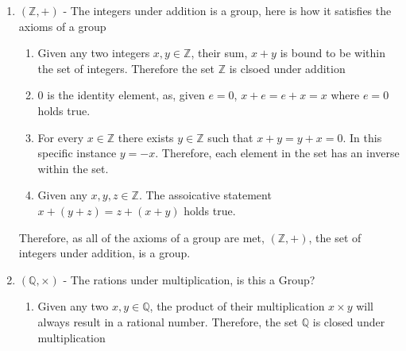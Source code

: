 \documentclass[11pt]{article}
\newcommand{\Q}{{\mathbb{Q}}}
\newcommand{\Z}{{\mathbb{Z}}}
\begin{document}
	\begin{enumerate}[{\bf S1.}] 

        \item $(\Z, +)$ - The integers under addition is a group, here is how it satisfies the axioms of a group
        
            \begin{enumerate}
                
                \item
                
                    Given any two integers $x, y\in\Z$, their sum, $x + y$ is bound to be within
                    the set of integers. Therefore the set $\Z$ is clsoed under addition

                \item 

                    $0$ is the identity element, as, given $e = 0$, $x + e = e + x = x$ where $e = 0$ holds true. 

                \item 

                    For every $x\in\Z$ there exists $y\in\Z$ such that $x + y = y + x = 0$. In this specific instance
                    $y = -x$. Therefore, each element in the set has an inverse within the set. 

                \item 

                    Given any $x, y, z\in\Z$. The assoicative statement $x + (y + z) = z + (x + y)$ holds true.

            \end{enumerate}

            Therefore, as all of the axioms of a group are met, $(\Z, +)$, the set of integers 
            under addition, is a group. \\

        \item $(\Q, \times)$ - The rations under multiplication, is this a Group?
        
            \begin{enumerate}
                
                \item 

                    Given any two $x, y\in\Q$, the product of their multiplication $x\times y$ will always result in a 
                    rational number. Therefore, the set $\Q$ is closed under multiplication


\end{enumerate}
\end{enumerate}
\end{document}

